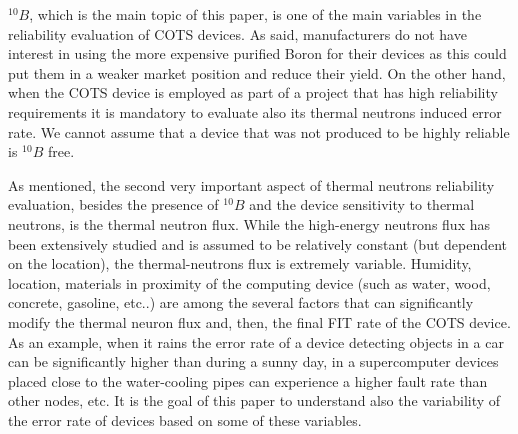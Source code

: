$^{10}B$, which is the main topic of this paper, is one of the main variables in the reliability evaluation of COTS devices. As said, manufacturers do not have interest in using the more expensive purified Boron for their devices as this could put them in a weaker market position and reduce their yield. On the other hand, when the COTS device is employed as part of a project that has high reliability requirements it is mandatory to evaluate also its thermal neutrons induced error rate. We cannot assume that a device that was not produced to be highly reliable is $^{10}B$ free.

As mentioned, the second very important aspect of thermal neutrons reliability evaluation, besides the presence of $^{10}B$ and the device sensitivity to thermal neutrons, is the thermal neutron flux. While the high-energy neutrons flux has been extensively studied and is assumed to be relatively constant (but dependent on the location), the thermal-neutrons flux is extremely variable. Humidity, location, materials in proximity of the computing device (such as water, wood, concrete, gasoline, etc..) are among the several factors that can significantly modify the thermal neuron flux and, then, the final FIT rate of the COTS device. As an example, when it rains the error rate of a device detecting objects in a car can be significantly higher than during a sunny day, in a supercomputer devices placed close to the water-cooling pipes can experience a higher fault rate than other nodes, etc. It is the goal of this paper to understand also the variability of the error rate of devices based on some of these variables.



